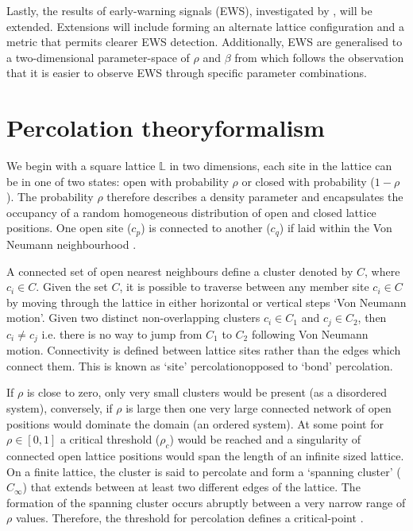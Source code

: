 Lastly, the results of early-warning signals (EWS), investigated by \cite{OROZCOFUENTES201912}, will be extended. 
Extensions will include forming an alternate lattice configuration and a metric that permits clearer EWS detection. %
Additionally, EWS are generalised to a two-dimensional parameter-space of $\rho$ and $\beta$ from which follows the observation that it is easier to observe EWS through specific parameter combinations.

\section{Percolation theory\textemdash formalism}
We begin with a square lattice $\mathbb{L}$ in two dimensions, each site in the lattice can be in one of two states: %
open with probability $\rho$ or closed with probability ($1-\rho$). %
The probability $\rho$ therefore describes a density parameter and encapsulates the occupancy of a random %
homogeneous distribution of open and closed lattice positions. %
One open site ($c_p$) is connected to another ($c_q$) if laid within the Von Neumann neighbourhood \cite{toffoli1987cellular}. %

A connected set of open nearest neighbours define a cluster denoted by $C$, where $c_i \in C$.%
Given the set $C$, it is possible to traverse between any member site $c_i \in C$ by moving through the lattice in either horizontal or vertical steps `Von Neumann motion'. %
Given two distinct non-overlapping clusters $c_i \in C_1$ and $c_j \in C_2$, then $c_i \neq c_j $ i.e. there is no way to jump from $C_1$ to $C_2$ following Von Neumann motion. %
Connectivity is defined between lattice sites rather than the edges which connect them. %
This is known as `site' percolation\textemdash opposed to `bond' percolation. %

If $\rho$ is close to zero, only very small clusters would be present (as a disordered system), %
conversely, if $\rho$ is large then one very large connected network of open positions would dominate the domain (an ordered system). %
At some point for $\rho \in [0, 1]$ a critical threshold ($\rho_c$) would be reached and a singularity of connected open lattice positions would span the length of an infinite sized lattice. %
On a finite lattice, the cluster is said to percolate and form a `spanning cluster' ($C_\infty$) that extends between at least two different edges of the lattice. %
The formation of the spanning cluster occurs abruptly between a very narrow range of $\rho$ values. %
Therefore, the threshold for percolation defines a critical-point \cite{STAUFFER19791}. %

